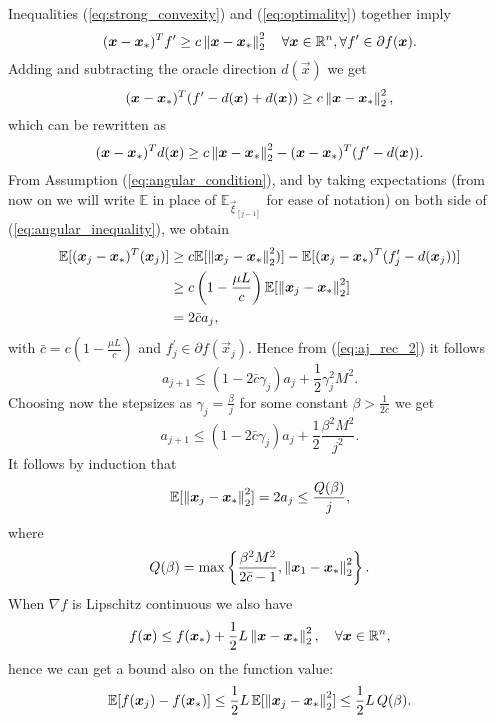 Inequalities (\ref{eq:strong_convexity}) and (\ref{eq:optimality}) together imply
\begin{equation}
(\boldsymbol{x}-\boldsymbol{x}_*)^T f^\prime \geq c \left\Vert \boldsymbol{x}-\boldsymbol{x}_* \right\Vert^2_2 \quad \forall \boldsymbol{x} \in \mathbb{R}^n, \forall f^\prime\in\partial f(\boldsymbol{x}).
\end{equation}
Adding and subtracting the oracle direction $d(\vec{x})$ we get
\begin{equation}
\label{eq:begin_modification}
(\boldsymbol{x}-\boldsymbol{x}_*)^T (f^\prime -d(\boldsymbol{x}) +d(\boldsymbol{x})) \geq c \left\Vert \boldsymbol{x}-\boldsymbol{x}_* \right\Vert^2_2,
\end{equation}
which can be rewritten as
\begin{equation}
(\boldsymbol{x}-\boldsymbol{x}_*)^T d(\boldsymbol{x}) \geq c \left\Vert \boldsymbol{x}-\boldsymbol{x}_* \right\Vert^2_2 - (\boldsymbol{x}-\boldsymbol{x}_*)^T (f^\prime -d(\boldsymbol{x})).
\label{eq:angular_inequality}
\end{equation}
From Assumption (\ref{eq:angular_condition}), and by taking expectations (from now on we will write $\mathbb{E}$ in place of $\mathbb{E}_{\vec{\xi}_{[j-1]}}$ for ease of notation) on both side of (\ref{eq:angular_inequality}), we obtain
\begin{align}
\mathbb{E}[(\boldsymbol{x}_j-\boldsymbol{x}_*)^T (\boldsymbol{x}_j)] &\geq c \mathbb{E}[\left\Vert \boldsymbol{x}_j-\boldsymbol{x}_* \right\Vert^2_2)] - \mathbb{E}[(\boldsymbol{x}_j-\boldsymbol{x}_*)^T (f_j^\prime -d(\boldsymbol{x}_j))]\\
&\geq c\left(1-\frac{\mu L}{c}\right) \mathbb{E}[\left\Vert \boldsymbol{x}_j-\boldsymbol{x}_* \right\Vert^2_2]\\
& = 2\bar{c}a_j,
\label{eq:end_modification}
\end{align}
with $\bar{c}=c(1-\frac{\mu L }{c})$ and $f_j^\prime \in \partial f(\vec{x}_j)$.
Hence from (\ref{eq:aj_rec_2}) it follows 
\begin{equation}
a_{j+1} \leq (1-2\bar{c}\gamma_j)a_j + \frac{1}{2}\gamma_j^2M^2.
\end{equation}
Choosing now the stepsizes as $\gamma_j = \frac{\beta}{j}$ for some constant $\beta>\frac{1}{2\bar{c}}$ we get
\begin{equation}
a_{j+1} \leq (1-2\bar{c}\gamma_j)a_j + \frac{1}{2}\frac{\beta^2M^2}{j^2}.
\end{equation}
It follows by induction that
\begin{equation}
\mathbb{E}[\left\Vert \boldsymbol{x}_j - \boldsymbol{x}_* \right\Vert^2_2] = 2a_j\leq \frac{Q(\beta)}{j},
\end{equation}
where 
\begin{equation}
Q(\beta) = \max\left\{\frac{\beta^2M^2}{2\bar{c}-1},\left\Vert \boldsymbol{x}_1 - \boldsymbol{x}_* \right\Vert^2_2 \right\}.
\end{equation}
When $\nabla f$ is Lipschitz continuous we also have
\begin{equation}
f(\boldsymbol{x})\leq f(\boldsymbol{x}_*) + \frac{1}{2}L\left\Vert \boldsymbol{x} - \boldsymbol{x}_* \right\Vert^2_2, \quad \forall \boldsymbol{x} \in \mathbb{R}^n,
\end{equation}
hence we can get a bound also on the function value:
\begin{equation}
\mathbb{E}[f(\boldsymbol{x}_j)-f(\boldsymbol{x}_*)] \leq \frac{1}{2} L\, \mathbb{E}[\left\Vert \boldsymbol{x}_j - \boldsymbol{x}_* \right\Vert^2_2] \leq \frac{1}{2}L\,Q(\beta).
\end{equation}

